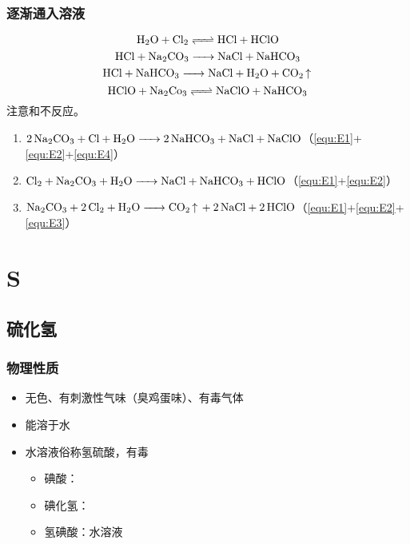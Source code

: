 \documentclass[a4paper]{article}
\begin{document}
	\subsubsection{逐渐通入溶液}
	\begin{equation}\label{equ:E1}
			\ce{H2O + Cl2 <=> HCl + HClO}
	\end{equation}
	\begin{equation}\label{equ:E2}
			\ce{HCl + Na2CO3 -> NaCl + NaHCO3}
	\end{equation}
	\begin{equation}\label{equ:E3}
			\ce{HCl + NaHCO3 -> NaCl + H2O + CO2 ^}
	\end{equation}
	\begin{equation}\label{equ:E4}
			\ce{HClO + Na2Co3 <=> NaClO + NaHCO3}
	\end{equation}
	注意和不反应。
	\begin{enumerate}
		\item $\ce{2Na2CO3 + Cl + H2O -> 2NaHCO3 + NaCl + NaClO}$（\ref{equ:E1}+\ref{equ:E2}+\ref{equ:E4}）
		\item $\ce{Cl2 + Na2CO3 + H2O -> NaCl + NaHCO3 + HClO}$（\ref{equ:E1}+\ref{equ:E2}）
		\item $\ce{Na2CO3 + 2Cl2 + H2O -> CO2 ^ + 2NaCl + 2HClO}$（\ref{equ:E1}+\ref{equ:E2}+\ref{equ:E3}）
	\end{enumerate}
	
	
	
	\clearpage
	\section{S}
	
	\subsection{硫化氢}
	\subsubsection{物理性质}
	\begin{itemize}
		\item 无色、有刺激性气味（臭鸡蛋味）、有毒气体
		\item 能溶于水
		\item {}水溶液俗称氢硫酸，有毒
		\begin{itemize}
		\item 碘酸：
		\item 碘化氢：
		\item 氢碘酸：水溶液
		\end{itemize}
	\end{itemize}
\end{document}
